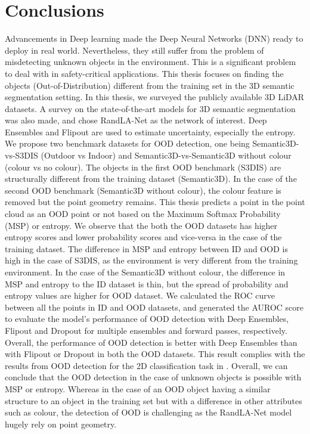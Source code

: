 

    \chapter{Conclusions}
    Advancements in Deep learning made the Deep Neural Networks (DNN) ready to deploy in real world.
    Nevertheless, they still suffer from the problem of misdetecting unknown objects in the environment.
    This is a significant problem to deal with in safety-critical applications.
    This thesis focuses on finding the objects (Out-of-Distribution) different from the training set in the 3D semantic segmentation setting.
    In this thesis, we surveyed the publicly available 3D LiDAR datasets.
    A survey on the state-of-the-art models for 3D semantic segmentation was also made, and chose RandLA-Net as the network of interest.
    Deep Ensembles and Flipout are used to estimate uncertainty, especially the entropy. 
    We propose two benchmark datasets for OOD detection, one being Semantic3D-vs-S3DIS (Outdoor vs Indoor) and Semantic3D-vs-Semantic3D without colour (colour vs no colour).
    The objects in the first OOD benchmark (S3DIS) are structurally different from the training dataset (Semantic3D).
    In the case of the second OOD benchmark (Semantic3D without colour), the colour feature is removed but the point geometry remains.
    This thesis predicts a point in the point cloud as an OOD point or not based on the Maximum Softmax Probability (MSP) or entropy.
    We observe that the both the OOD datasets has higher entropy scores and lower probability scores and vice-versa in the case of the training dataset.
    The difference in MSP and entropy between ID and OOD is high in the case of S3DIS, as the environment is very different from the training environment.
    In the case of the Semantic3D without colour, the difference in MSP and entropy to the ID dataset is thin, but the spread of probability and entropy values are higher for OOD dataset.
    We calculated the ROC curve between all the points in ID and OOD datasets, and generated the AUROC score to evaluate the model's performance of OOD detection with Deep Ensembles, Flipout and Dropout for multiple ensembles and forward passes, respectively.
    Overall, the performance of OOD detection is better with Deep Ensembles than with Flipout or Dropout in both the OOD datasets.
    This result complies with the results from OOD detection for the 2D classification task in \cite{lakshminarayanan2016simple}.
    Overall, we can conclude that the OOD detection in the case of unknown objects is possible with MSP or entropy.
    Whereas in the case of an OOD object having a similar structure to an object in the training set but with a difference in other attributes such as colour, the detection of OOD is challenging as the RandLA-Net model hugely rely on point geometry.
    

